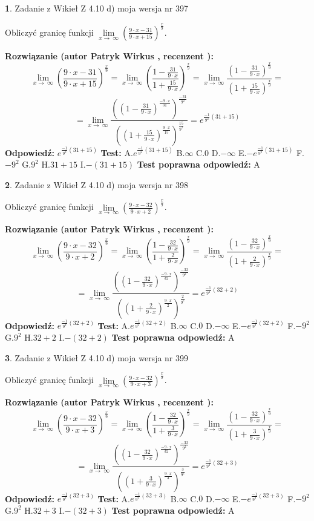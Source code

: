 \documentclass[12pt, a4paper]{article}
\theoremstyle{definition} %
\newtheorem{zad}{}
\newcommand{\zadStart}[1]{\begin{zad}#1\newline}
\newcommand{\zadStop}{\end{zad}}
\newcommand{\rozwStart}[2]{\noindent \textbf{Rozwiązanie (autor #1 , recenzent #2): }\newline}
\newcommand{\rozwStop}{\newline}
\newcommand{\odpStart}{\noindent \textbf{Odpowiedź:}\newline}
\newcommand{\odpStop}{\newline}
\newcommand{\testStart}{\noindent \textbf{Test:}\newline}
\newcommand{\testStop}{\newline}
\newcommand{\kluczStart}{\noindent \textbf{Test poprawna odpowiedź:}\newline}
\newcommand{\kluczStop}{\newline}
\begin{document}
\zadStart{Zadanie z Wikieł Z 4.10 d) moja wersja nr 397}


Obliczyć granicę funkcji  $\lim\limits_{x\to\ \infty}(\frac{9\cdot x-31}{9\cdot x+15})^{\frac{x}{9}}$.
\zadStop
\rozwStart{Patryk Wirkus}{}
$$\lim\limits_{x\to\ \infty}(\frac{9\cdot x-31}{9\cdot x+15})^{\frac{x}{9}} = \lim\limits_{x\to\ \infty}(\frac{1-\frac{31}{9\cdot x}}{1+\frac{15}{9\cdot x}})^{\frac{x}{9}}=\lim\limits_{x\to\ \infty}\frac{(1-\frac{31}{9\cdot x})^{\frac{x}{9}}}{(1+\frac{15}{9\cdot x})^{\frac{x}{9}}}=$$
$$=\lim\limits_{x\to\ \infty}\frac{((1-\frac{31}{9\cdot x})^{\frac{-9\cdot x}{31}})^{\frac{-31}{9^{2}}}}{((1+\frac{15}{9\cdot x})^{\frac{9\cdot x}{15}})^{\frac{15}{9^{2}}}}=e^{\frac{-1}{9^{2}}(31+15)}$$
\rozwStop
\odpStart
$e^{\frac{-1}{9^{2}}(31+15)}$
\odpStop
\testStart
A.$e^{\frac{-1}{9^{2}}(31+15)}$ B.$\infty$ C.$0$ D.$-\infty$ E.$-e^{\frac{-1}{9^{2}}(31+15)}$
F.$-9^{2}$ G.$9^{2}$
H.$31+15$
I.$-(31+15)$
\testStop
\kluczStart
A
\kluczStop



\zadStart{Zadanie z Wikieł Z 4.10 d) moja wersja nr 398}


Obliczyć granicę funkcji  $\lim\limits_{x\to\ \infty}(\frac{9\cdot x-32}{9\cdot x+2})^{\frac{x}{9}}$.
\zadStop
\rozwStart{Patryk Wirkus}{}
$$\lim\limits_{x\to\ \infty}(\frac{9\cdot x-32}{9\cdot x+2})^{\frac{x}{9}} = \lim\limits_{x\to\ \infty}(\frac{1-\frac{32}{9\cdot x}}{1+\frac{2}{9\cdot x}})^{\frac{x}{9}}=\lim\limits_{x\to\ \infty}\frac{(1-\frac{32}{9\cdot x})^{\frac{x}{9}}}{(1+\frac{2}{9\cdot x})^{\frac{x}{9}}}=$$
$$=\lim\limits_{x\to\ \infty}\frac{((1-\frac{32}{9\cdot x})^{\frac{-9\cdot x}{32}})^{\frac{-32}{9^{2}}}}{((1+\frac{2}{9\cdot x})^{\frac{9\cdot x}{2}})^{\frac{2}{9^{2}}}}=e^{\frac{-1}{9^{2}}(32+2)}$$
\rozwStop
\odpStart
$e^{\frac{-1}{9^{2}}(32+2)}$
\odpStop
\testStart
A.$e^{\frac{-1}{9^{2}}(32+2)}$ B.$\infty$ C.$0$ D.$-\infty$ E.$-e^{\frac{-1}{9^{2}}(32+2)}$
F.$-9^{2}$ G.$9^{2}$
H.$32+2$
I.$-(32+2)$
\testStop
\kluczStart
A
\kluczStop



\zadStart{Zadanie z Wikieł Z 4.10 d) moja wersja nr 399}


Obliczyć granicę funkcji  $\lim\limits_{x\to\ \infty}(\frac{9\cdot x-32}{9\cdot x+3})^{\frac{x}{9}}$.
\zadStop
\rozwStart{Patryk Wirkus}{}
$$\lim\limits_{x\to\ \infty}(\frac{9\cdot x-32}{9\cdot x+3})^{\frac{x}{9}} = \lim\limits_{x\to\ \infty}(\frac{1-\frac{32}{9\cdot x}}{1+\frac{3}{9\cdot x}})^{\frac{x}{9}}=\lim\limits_{x\to\ \infty}\frac{(1-\frac{32}{9\cdot x})^{\frac{x}{9}}}{(1+\frac{3}{9\cdot x})^{\frac{x}{9}}}=$$
$$=\lim\limits_{x\to\ \infty}\frac{((1-\frac{32}{9\cdot x})^{\frac{-9\cdot x}{32}})^{\frac{-32}{9^{2}}}}{((1+\frac{3}{9\cdot x})^{\frac{9\cdot x}{3}})^{\frac{3}{9^{2}}}}=e^{\frac{-1}{9^{2}}(32+3)}$$
\rozwStop
\odpStart
$e^{\frac{-1}{9^{2}}(32+3)}$
\odpStop
\testStart
A.$e^{\frac{-1}{9^{2}}(32+3)}$ B.$\infty$ C.$0$ D.$-\infty$ E.$-e^{\frac{-1}{9^{2}}(32+3)}$
F.$-9^{2}$ G.$9^{2}$
H.$32+3$
I.$-(32+3)$
\testStop
\kluczStart
A
\kluczStop
\end{document}
